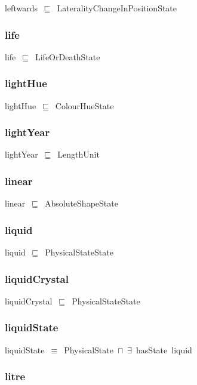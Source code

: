\documentclass{article}
\begin{document}
leftwards~\ensuremath{\sqsubseteq}~LateralityChangeInPositionState~

\subsubsection*{life}

life~\ensuremath{\sqsubseteq}~LifeOrDeathState~

\subsubsection*{lightHue}

lightHue~\ensuremath{\sqsubseteq}~ColourHueState~

\subsubsection*{lightYear}

lightYear~\ensuremath{\sqsubseteq}~LengthUnit~

\subsubsection*{linear}

linear~\ensuremath{\sqsubseteq}~AbsoluteShapeState~

\subsubsection*{liquid}

liquid~\ensuremath{\sqsubseteq}~PhysicalStateState~

\subsubsection*{liquidCrystal}

liquidCrystal~\ensuremath{\sqsubseteq}~PhysicalStateState~

\subsubsection*{liquidState}

liquidState~\ensuremath{\equiv}~PhysicalState~\ensuremath{\sqcap}~\ensuremath{\exists}~hasState~liquid

\subsubsection*{litre}
\end{document}
